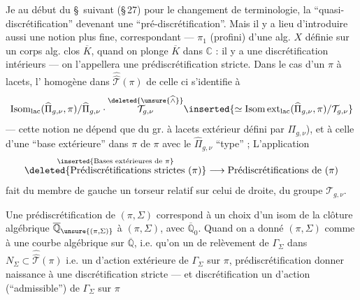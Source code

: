 Je  au début du \S\ suivant (\S\,27) pour le
changement de terminologie, la ``quasi-discrétification''
devenant une ``pré-discrétification''. Mais il y a lieu
d'introduire aussi une notion plus fine, correspondant
---   $\pi_1$ (profini) d'une  alg.
$X$ définie sur un corps alg. clos $\overline K$, quand on plonge
$\overline K$ dans $\mathbb C$ : il y a une discrétification 
 intérieurs --- on l'appellera une
prédiscrétification stricte. Dans le cas d'un
$\pi$ à lacets, l' homogène  dans $\widehat{\widehat{\mathcal T}}(\pi)$ de
celle ci s'identifie à
\[
\operatorname{Isom}_{\mathrm{lac}}(\widehat{\Pi}_{g,\nu},\pi)/\widehat{\Pi}_{g,\nu}\cdot
\overset{\deleted{\unsure{\widehat{\wedge}}}}{\mathcal T_{g,\nu}}
\inserted{\simeq\operatorname{Isom\,ext}_{\mathrm{lac}}(\widehat{\Pi}_{g,\nu},\pi)/\mathcal T_{g,\nu}}
\]
--- cette notion  ne dépend que du gr.  à lacets
extérieur défini par $\Pi_{g,\nu}$), et  
à celle d'une ``base extérieure'' dans $\pi$
de $\pi$ avec le $\widehat{\Pi}_{g,\nu}$ ``type'' ;
L'application
\[
\overset{\inserted{\text{Bases extérieures de }\pi}}{\deleted{\text{Prédiscrétifications strictes }(\pi)}}
\longrightarrow \text{Prédiscrétifications de }(\pi)
\]
fait  du membre de gauche un torseur relatif
 sur celui de droite, du groupe $\mathcal T_{g,\nu}$.

Une prédiscrétification de $(\pi,\Sigma)$ correspond à un
choix d'un isom de la clôture algébrique $\overline{\mathbb Q}_{\unsure{(\pi,\Sigma)}}$  
à $(\pi,\Sigma)$, avec $\overline{\mathbb Q}_0$. Quand on a donné $(\pi,\Sigma)$ comme
 à une courbe algébrique sur $\overline{\mathbb Q}$, i.e. qu'on
 un  de relèvement de $\Gamma_\Sigma$ dans $N_\Sigma\subset\widehat{\widehat{\mathcal T}}(\pi)$
i.e. un  d'action extérieure de $\Gamma_\Sigma$ sur $\pi$, 
prédiscrétification  donner naissance à une discrétification
stricte --- et   discrétification  
un  d'action (``admissible'') de $\Gamma_\Sigma$ sur $\pi$ \unsure{\ldots}

